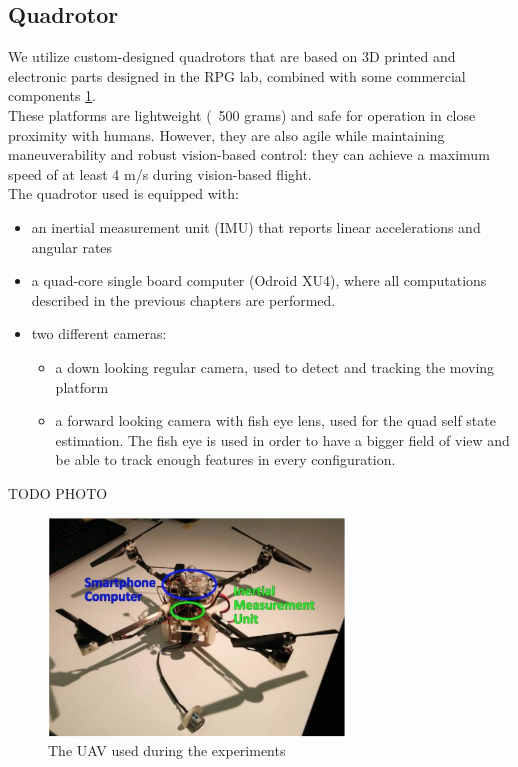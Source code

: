 \subsection{Quadrotor}
We utilize custom-designed quadrotors that are based on 3D printed and electronic parts designed in the RPG lab, combined with some commercial components \ref{fig:quad_hardware}.\\
These platforms are lightweight (~500 grams) and safe for operation in close proximity with humans. However, they are also agile while maintaining maneuverability and robust vision-based control: they can achieve a maximum speed of at least 4 m/s during vision-based flight.\\
The quadrotor used is equipped with:
\begin{itemize}
\item an inertial measurement unit (IMU) that reports linear accelerations and angular rates
\item a quad-core single board computer (Odroid XU4), where all computations described in the previous chapters are performed.
\item two different cameras:
\begin{itemize}
\item a down looking regular camera, used to detect and tracking the moving platform
\item a forward looking camera with fish eye lens, used for the quad self state estimation. The fish eye is used in order to have a bigger field of view and be able to track enough features in every configuration.
\end{itemize}
\end{itemize}
TODO PHOTO
\begin{figure}[!ht]
    \centering
    \includegraphics[width=0.7\textwidth]{img/photo_quad.png}
    \caption{The UAV used during the experiments}
    \label{fig:quad_hardware}
\end{figure}

